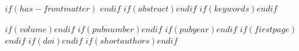 $if(has-frontmatter)$
\frontmatter
$endif$
$if(abstract)$$endif$
$if(keywords)$$endif$
\maketitle
$if(volume)$$endif$
$if(pubnumber)$$endif$
$if(pubyear)$$endif$
$if(firstpage)$$endif$
$if(doi)$$endif$
$if(shortauthors)$$endif$
